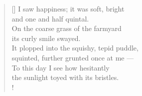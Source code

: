 \documentclass[a4paper,12pt,twoside,final]{book}
\begin{document}
\newpage


\settowidth{\versewidth}{It plopped into the squishy, tepid puddle,}

\begin{verse}[\versewidth]
  I saw happiness; it was soft, bright \\
  and one and half quintal. \\
  On the coarse grass of the farmyard \\
  its curly smile swayed. \\
  It plopped into the squishy, tepid puddle, \\
  squinted, further grunted once at me --- \\
  To this day I see how hesitantly \\
  the sunlight toyed with its bristles. \\!
\end{verse}


\newpage

\settowidth{\versewidth}{hunyorgott, röffent még felém ---}
\end{document}
